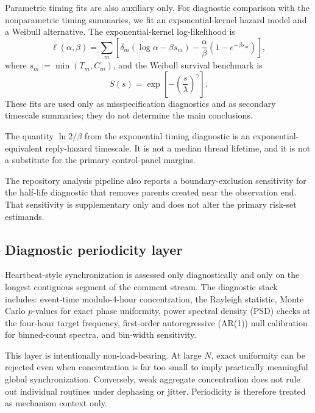 Parametric timing fits are also auxiliary only. For diagnostic comparison with
the nonparametric timing summaries, we fit an exponential-kernel hazard model
and a Weibull alternative. The exponential-kernel log-likelihood is
\begin{equation}
\label{eq:exponential-ll}
\ell(\alpha,\beta)
=
\sum_m
\left[
\delta_m(\log \alpha-\beta s_m)
-
\frac{\alpha}{\beta}\left(1-e^{-\beta s_m}\right)
\right],
\end{equation}
where \(s_m:=\min(T_m,C_m)\), and the Weibull survival benchmark is
\begin{equation}
\label{eq:weibull-survival}
S(s)=\exp\!\left[-\left(\frac{s}{\lambda}\right)^{\gamma}\right].
\end{equation}
These fits are used only as misspecification diagnostics and as secondary
timescale summaries; they do not determine the main conclusions.

\begin{remark}
\label{rem:estimand}
The quantity \(\ln 2/\beta\) from the exponential timing diagnostic is an
exponential-equivalent reply-hazard timescale. It is not a median thread
lifetime, and it is not a substitute for the primary control-panel margins.
\end{remark}

The repository analysis pipeline also reports a boundary-exclusion sensitivity
for the half-life diagnostic that removes parents created near the observation
end. That sensitivity is supplementary only and does not alter the primary
risk-set estimands.

\subsection{Diagnostic periodicity layer}
\label{sec:methods:periodicity}

Heartbeat-style synchronization is assessed only diagnostically and only on the
longest contiguous segment of the comment stream. The diagnostic stack includes:
event-time modulo-4-hour concentration, the Rayleigh statistic, Monte Carlo
\(p\)-values for exact phase uniformity, power spectral density (PSD) checks at
the four-hour target frequency, first-order autoregressive (AR(1)) null
calibration for binned-count spectra, and bin-width sensitivity.

This layer is intentionally non-load-bearing. At large \(N\), exact uniformity
can be rejected even when concentration is far too small to imply practically
meaningful global synchronization. Conversely, weak aggregate concentration does
not rule out individual routines under dephasing or jitter. Periodicity is
therefore treated as mechanism context only.

